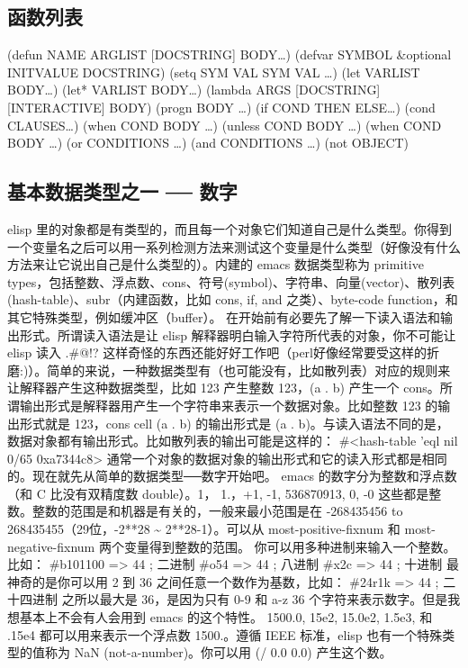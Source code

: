 \documentclass[11pt]{ctexart}
\begin{document}
\subsection{函数列表}
\label{sec:orgc6a59a0}
(defun NAME ARGLIST [DOCSTRING] BODY\ldots{})
(defvar SYMBOL \&optional INITVALUE DOCSTRING)
(setq SYM VAL SYM VAL \ldots{})
(let VARLIST BODY\ldots{})
(let* VARLIST BODY\ldots{})
(lambda ARGS [DOCSTRING] [INTERACTIVE] BODY)
(progn BODY \ldots{})
(if COND THEN ELSE\ldots{})
(cond CLAUSES\ldots{})
(when COND BODY \ldots{})
(unless COND BODY \ldots{})
(when COND BODY \ldots{})
(or CONDITIONS \ldots{})
(and CONDITIONS \ldots{})
(not OBJECT)

\subsection{基本数据类型之一 ── 数字}
\label{sec:org9eaa1b0}

elisp 里的对象都是有类型的，而且每一个对象它们知道自己是什么类型。你得到一个变量名之后可以用一系列检测方法来测试这个变量是什么类型（好像没有什么方法来让它说出自己是什么类型的）。内建的 emacs 数据类型称为 primitive types，包括整数、浮点数、cons、符号(symbol)、字符串、向量(vector)、散列表(hash-table)、subr（内建函数，比如 cons, if, and 之类）、byte-code function，和其它特殊类型，例如缓冲区（buffer）。
在开始前有必要先了解一下读入语法和输出形式。所谓读入语法是让 elisp 解释器明白输入字符所代表的对象，你不可能让 elisp 读入 .\#@!? 这样奇怪的东西还能好好工作吧（perl好像经常要受这样的折磨:)）。简单的来说，一种数据类型有（也可能没有，比如散列表）对应的规则来让解释器产生这种数据类型，比如 123 产生整数 123，(a . b) 产生一个 cons。所谓输出形式是解释器用产生一个字符串来表示一个数据对象。比如整数 123 的输出形式就是 123，cons cell (a . b) 的输出形式是 (a . b)。与读入语法不同的是，数据对象都有输出形式。比如散列表的输出可能是这样的：
\#<hash-table 'eql nil 0/65 0xa7344c8>
通常一个对象的数据对象的输出形式和它的读入形式都是相同的。现在就先从简单的数据类型──数字开始吧。
emacs 的数字分为整数和浮点数（和 C 比没有双精度数 double）。1， 1.，+1, -1, 536870913, 0, -0 这些都是整数。整数的范围是和机器是有关的，一般来最小范围是在 -268435456 to 268435455（29位，-2**28 \textasciitilde{} 2**28-1）。可以从 most-positive-fixnum 和 most-negative-fixnum 两个变量得到整数的范围。
你可以用多种进制来输入一个整数。比如：
\#b101100 => 44      ; 二进制
\#o54 => 44          ; 八进制
\#x2c => 44          ; 十进制
最神奇的是你可以用 2 到 36 之间任意一个数作为基数，比如：
\#24r1k => 44        ; 二十四进制
之所以最大是 36，是因为只有 0-9 和 a-z 36 个字符来表示数字。但是我想基本上不会有人会用到 emacs 的这个特性。
1500.0, 15e2, 15.0e2, 1.5e3, 和 .15e4 都可以用来表示一个浮点数 1500.。遵循 IEEE 标准，elisp 也有一个特殊类型的值称为 NaN (not-a-number)。你可以用 (/ 0.0 0.0) 产生这个数。
\end{document}
